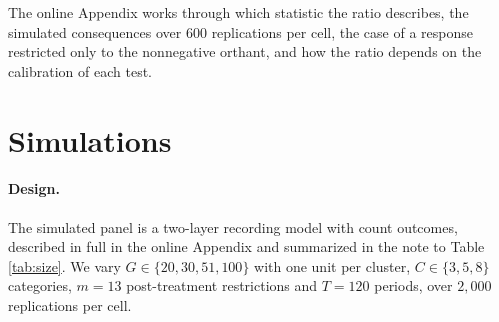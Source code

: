 \documentclass[12pt]{article}
\theoremstyle{definition}
\numberwithin{equation}{section}
\begin{document}
The online Appendix works through which statistic the ratio describes, the
simulated consequences over $600$ replications per cell, the case of a
response restricted only to the nonnegative orthant, and how the ratio
depends on the calibration of each test.

\section{Simulations}
\label{sec:sim}

\paragraph{Design.} The simulated panel is a two-layer recording
model with count outcomes, described in full in the online Appendix and
summarized in the note to Table \ref{tab:size}. We vary $G \in
\{20,30,51,100\}$ with one unit per cluster, $C \in \{3,5,8\}$ categories,
$m = 13$ post-treatment restrictions and $T = 120$ periods, over $2{,}000$
replications per cell.
\end{document}
